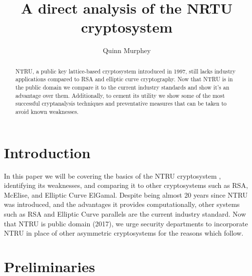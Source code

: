 \documentclass[12pt]{amsart}
\theoremstyle{definition}
\theoremstyle{remark}
\begin{document}
 
\renewcommand{\qedsymbol}{$\blacksquare$}
 
\title{A direct analysis of the NRTU cryptosystem}
\author{Quinn Murphey}
\begin{abstract}

NTRU, a public key lattice-based cryptosystem introduced in 1997, still lacks industry applications compared to RSA and elliptic curve cryptography. Now that NTRU is in the public domain we compare it to the current industry standards and show it's an advantage over them. Additionally, to cement its utility we show some of the most successful cryptanalysis techniques and preventative measures that can be taken to avoid known weaknesses.


\end{abstract}
\maketitle

\section{Introduction}

In this paper we will be covering the basics of the NTRU cryptosystem \cite{NTRUpatent}, identifying its weaknesses, and comparing it to other cryptosystems such as RSA, McElise, and Elliptic Curve ElGamal. Despite being almost 20 years since NTRU was introduced, and the advantages it provides computationally, other systems such as RSA and Elliptic Curve parallels are the current industry standard. Now that NTRU is public domain (2017), we urge security departments to incorporate NTRU in place of other asymmetric cryptosystems for the reasons which follow.

\section{Preliminaries}
\end{document}
